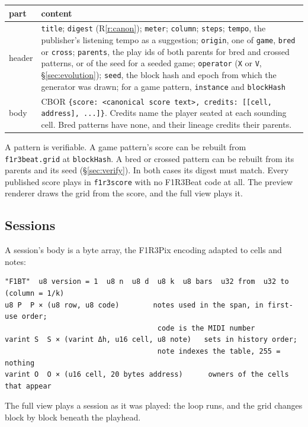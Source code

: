 \documentclass[11pt,a4paper]{article}
\newcommand{\code}[1]{\texttt{#1}}
\begin{document}
\begin{center}\small
\begin{tabularx}{\linewidth}{@{}l X@{}}
\toprule
part & content\\
\midrule
header & \code{title}; \code{digest} (R\ref{r:canon}); \code{meter}; \code{column}; \code{steps}; \code{tempo}, the publisher's listening tempo as a suggestion; \code{origin}, one of \code{game}, \code{bred} or \code{cross}; \code{parents}, the play ids of both parents for bred and crossed patterns, or of the seed for a seeded game; \code{operator} (\code{X} or \code{V}, \S\ref{sec:evolution}); \code{seed}, the block hash and epoch from which the generator was drawn; for a game pattern, \code{instance} and \code{blockHash}\\
body & CBOR \code{\{score: <canonical score text>, credits: [[cell, address], ...]\}}. Credits name the player seated at each sounding cell. Bred patterns have none, and their lineage credits their parents.\\
\bottomrule
\end{tabularx}
\end{center}

A pattern is verifiable. A game pattern's score can be rebuilt from \code{f1r3beat.grid} at
\code{blockHash}. A bred or crossed pattern can be rebuilt from its parents and its seed
(\S\ref{sec:verify}). In both cases its digest must match. Every published score plays in
\code{f1r3score} with no F1R3Beat code at all. The preview renderer draws the grid from the
score, and the full view plays it.

\subsection{Sessions}

A session's body is a byte array, the F1R3Pix encoding adapted to cells and notes:

\begin{lstlisting}
"F1BT"  u8 version = 1  u8 n  u8 d  u8 k  u8 bars  u32 from  u32 to   (column = 1/k)
u8 P  P × (u8 row, u8 code)        notes used in the span, in first-use order;
                                    code is the MIDI number
varint S  S × (varint Δh, u16 cell, u8 note)   sets in history order;
                                    note indexes the table, 255 = nothing
varint O  O × (u16 cell, 20 bytes address)      owners of the cells that appear
\end{lstlisting}

The full view plays a session as it was played: the loop runs, and the grid changes block by
block beneath the playhead.
\end{document}
